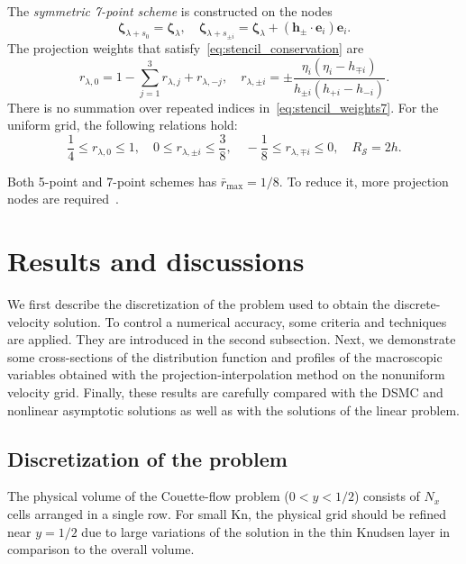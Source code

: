 \documentclass[review]{elsarticle}
\newcommand{\Kn}{\mathrm{Kn}}
\newcommand{\bzeta}{\boldsymbol{\zeta}}
\newcommand{\bh}{\boldsymbol{h}}
\newcommand{\be}{\boldsymbol{e}}
\begin{document}
The \emph{symmetric 7-point scheme} is constructed on the nodes
\begin{equation}\label{eq:stencil_nodes7}
    \bzeta_{\lambda+s_0} = \bzeta_{\lambda}, \quad
    \bzeta_{\lambda+s_{\pm i}} = \bzeta_{\lambda} + (\bh_\pm\cdot \be_i)\be_i.
\end{equation}
The projection weights that satisfy~\eqref{eq:stencil_conservation} are
\begin{equation}\label{eq:stencil_weights7}
    r_{\lambda,0} = 1 - \sum_{j=1}^3 r_{\lambda,j} + r_{\lambda,-j}, \quad
    r_{\lambda,\pm i} = \pm\frac{\eta_i(\eta_i - h_{\mp i})}{h_{\pm i}(h_{+i}-h_{-i})}.
\end{equation}
There is no summation over repeated indices in~\eqref{eq:stencil_weights7}.
For the uniform grid, the following relations hold:
\begin{equation}\label{eq:weights_ranges7}
    \frac14 \leq r_{\lambda,0} \leq 1, \quad
    0 \leq r_{\lambda,\pm i} \leq \frac38, \quad
    -\frac18 \leq r_{\lambda,\mp i} \leq 0, \quad
    R_\mathcal{S} = 2h.
\end{equation}

Both 5-point and 7-point schemes has \(\bar{r}_{\max}=1/8\).
To reduce it, more projection nodes are required~\citep{Dodulad2012}.

\section{Results and discussions}

We first describe the discretization of the problem used to obtain the discrete-velocity solution.
To control a numerical accuracy, some criteria and techniques are applied.
They are introduced in the second subsection.
Next, we demonstrate some cross-sections of the distribution function and
profiles of the macroscopic variables obtained with
the projection-interpolation method on the nonuniform velocity grid.
Finally, these results are carefully compared with the DSMC and nonlinear asymptotic solutions
as well as with the solutions of the linear problem.

\subsection{Discretization of the problem}

The physical volume of the Couette-flow problem (\(0<y<1/2\)) consists of \(N_x\) cells arranged in a single row.
For small \(\Kn\), the physical grid should be refined near \(y=1/2\)
due to large variations of the solution in the thin Knudsen layer in comparison to the overall volume.
\end{document}
